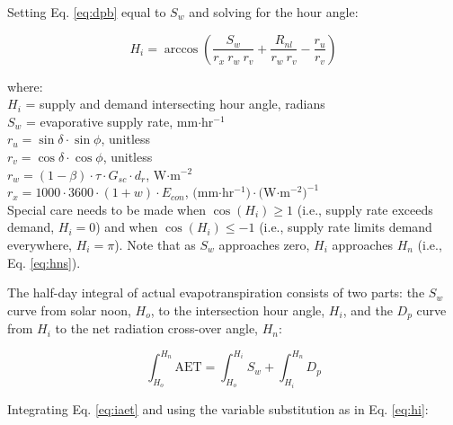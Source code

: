\noindent Setting Eq. \ref{eq:dpb} equal to $S_w$ and solving for the hour angle:

\begin{equation}
\label{eq:hi}
	H_i = \arccos \left( \frac{S_w}{r_x\: r_w\: r_v}
	                   + \frac{R_{nl}}{r_w\: r_v}
	                   - \frac{r_u}{r_v} \right)
\end{equation}

\noindent where:\\
\indent $H_i$ = supply and demand intersecting hour angle, radians\\
\indent $S_w$ = evaporative supply rate, mm$\cdot$hr$^{-1}$\\
\indent $r_u = \sin\delta\cdot\sin\phi$, unitless \\
\indent $r_v = \cos\delta\cdot\cos\phi$, unitless \\
\indent $r_w = \left(1-\beta\right)\cdot\tau\cdot G_{sc}\cdot d_r$, W$\cdot$m$^{-2}$\\
\indent $r_x = 1000\cdot 3600\cdot\left(1+w\right)\cdot E_{con}$, $($mm$\cdot$hr$^{-1})\cdot ($W$\cdot$m$^{-2})^{-1}$\\

\noindent Special care needs to be made when $\cos\left( H_i\right) \geq 1$ (i.e., supply rate exceeds demand, $H_i = 0$) and when $\cos\left( H_i\right) \leq -1$ (i.e., supply rate limits demand everywhere, $H_i = \pi$). Note that as $S_w$ approaches zero, $H_i$ approaches $H_n$ (i.e., Eq. \ref{eq:hns}).

The half-day integral of actual evapotranspiration consists of two parts: the $S_w$ curve from solar noon, $H_o$, to the intersection hour angle, $H_i$, and the $D_p$ curve from $H_i$ to the net radiation cross-over angle, $H_n$:

\begin{equation}
\label{eq:iaet}
	\int_{H_o}^{H_n} \text{AET} = \int_{H_o}^{H_i} S_w + \int_{H_i}^{H_n} D_p
\end{equation}

Integrating Eq. \ref{eq:iaet} and using the variable substitution as in Eq. \ref{eq:hi}:

